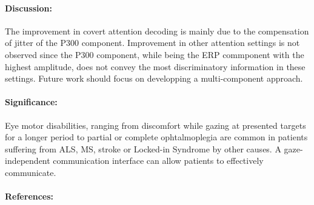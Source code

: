\documentclass{article}
\begin{document}
\paragraph{Discussion:} The improvement in covert attention decoding is mainly due to the compensation of jitter of the P300 component. Improvement in other attention settings is not observed since the P300 component, while being the ERP commponent with the highest amplitude, does not convey the most discriminatory information in these settings. Future work should focus on developping a multi-component approach.

\paragraph{Significance:} Eye motor disabilities, ranging from discomfort while gazing at presented targets for a longer period to partial or complete ophtalmoplegia are common in patients suffering from ALS, MS, stroke or Locked-in Syndrome by other causes. A gaze-independent communication interface can allow patients to effectively communicate.

\paragraph{References:}
\footnotesize
\printbibliography[heading=none]
\end{document}
